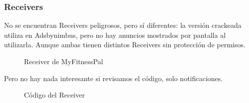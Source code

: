 \documentclass[12pt,twoside]{article}
\begin{document}
\subsubsection{Receivers}
No se encuentran Receivers peligrosos, pero sí diferentes: la versión crackeada utiliza en Adsbynimbus, pero no hay anuncios mostrados por pantalla al utilizarla. Aunque ambas tienen distintos Receivers sin protección de permisos.
\begin{figure}[H]
    \centering
    \caption{Receiver de MyFitnessPal}
\end{figure}
Pero no hay nada interesante si revisamos el código, solo notificaciones.
\begin{figure}[H]
    \centering
    \caption{Código del Receiver}
\end{figure}
\end{document}
